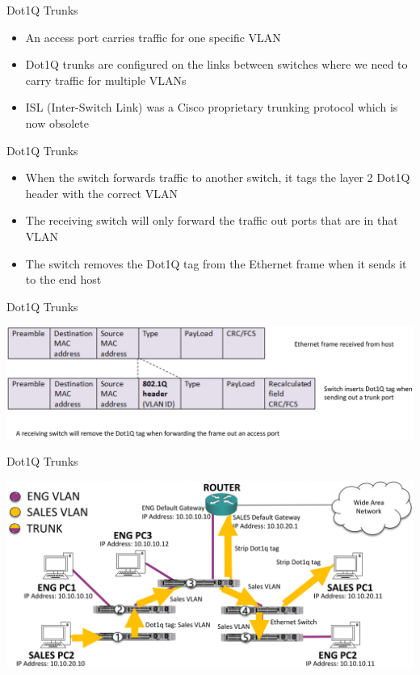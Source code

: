 \documentclass[pdflatex,compress,mathserif]{beamer}
\begin{document}
\begin{frame}{Dot1Q Trunks}
	\begin{itemize}
		\item An access port carries traffic for one specific VLAN
		\item Dot1Q trunks are configured on the links between switches where we
need to carry traffic for multiple VLANs
		\item ISL (Inter-Switch Link) was a Cisco proprietary trunking protocol which
is now obsolete
	\end{itemize}
\end{frame}

\begin{frame}{Dot1Q Trunks}
	\begin{itemize}
		\item When the switch forwards traffic to another switch, it tags the layer 2
Dot1Q header with the correct VLAN
		\item The receiving switch will only forward the traffic out ports that are in
that VLAN
		\item The switch removes the Dot1Q tag from the Ethernet frame when it
sends it to the end host
	\end{itemize}
\end{frame}

\begin{frame}{Dot1Q Trunks}
	\begin{center}
		\includegraphics[width=\linewidth]{img/img22}
	\end{center}
\end{frame}

\begin{frame}{Dot1Q Trunks}
	\begin{center}
		\includegraphics[width=\linewidth]{img/img23}
	\end{center}
\end{frame}
\end{document}
